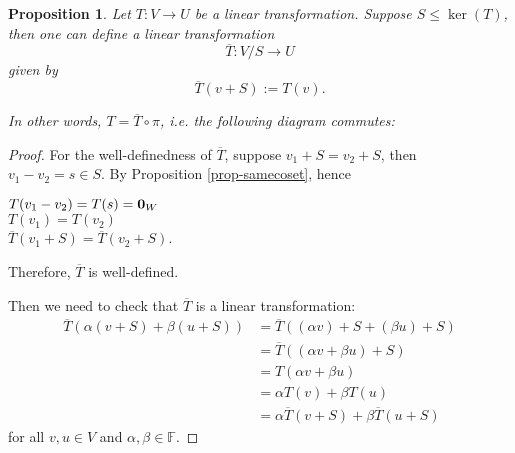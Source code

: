 \documentclass[12pt]{amsbook}
\newtheorem{proposition}[theorem]{Proposition}
\begin{document}
\begin{proposition} \label{prop-universalquot}
    Let $T: V \to U$ be a linear transformation. Suppose $S \leq \ker(T)$, then one can define a linear transformation
    $$\overline{T}: V/S \to U$$
    given by 
    $$\overline{T}(v+S) := T(v).$$ 

    In other words, $T = \overline{T} \circ \pi$, i.e. the following diagram commutes:
    \smallskip
\begin{center}
\end{center}
\end{proposition}
\begin{proof}
For the well-definedness of $\overline{T}$, suppose $v_1+S =v_2+S$, then $v_1-v_2 = s \in S$. By Proposition \ref{prop-samecoset}, hence
\begin{center}
    $T(v_1-v_2) = T(s) = {\bf 0}_{W}$ \\
    $T(v_1) = T(v_2)$ \\
    $\overline{T}(v_1+S) = \overline{T}(v_2+S)$.
\end{center}
Therefore, $\overline{T}$ is well-defined.

Then we need to check that $\overline{T}$ is a linear transformation:
\begin{align*}
    \overline{T}(\alpha(v+S)+\beta(u+S)) &= \overline{T}((\alpha v)+S+(\beta u)+S) \\
    &= \overline{T}((\alpha v+\beta u)+S) \\
    &= T(\alpha v+\beta u) \\
    &= \alpha T(v) + \beta T(u) \\
    &= \alpha \overline{T}(v+S) + \beta \overline{T}(u+S)
\end{align*}
for all $v, u \in V$ and $\alpha , \beta \in \mathbb{F}$.
\end{proof}
\end{document}

